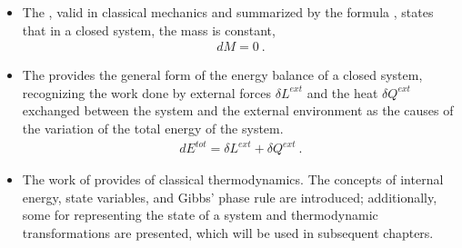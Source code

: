 \documentclass[letterpaper,10pt,english]{jupyterBook}
\begin{document}
\begin{itemize}
\item {} 
\sphinxAtStartPar
The {\hyperref[\detokenize{ch/principles-lavoisier:physics-hs-thermodynamics-foundation-principles-lavoisier}]{}}, valid in classical mechanics and summarized by the formula , states that in a closed system, the mass is constant,
\begin{equation*}
\begin{split}d M = 0 \ .\end{split}
\end{equation*}
\item {} 
\sphinxAtStartPar
The {\hyperref[\detokenize{ch/principles-first:physics-hs-thermodynamics-foundation-principles-first}]{}} provides the general form of the  energy balance of a closed system, recognizing the work done by external forces \(\delta L^{ext}\) and the heat \(\delta Q^{ext}\) exchanged between the system and the external environment as the causes of the variation of the total energy of the system.
\begin{equation*}
\begin{split}d E^{tot} = \delta L^{ext} + \delta Q^{ext} \ .\end{split}
\end{equation*}
\item {} 
\sphinxAtStartPar
The work of  provides {\hyperref[\detokenize{ch/principles-gibbs-phase-rule:physics-hs-thermodynamics-foundation-principles-gibbs-phase-rule}]{}} of classical thermodynamics. The concepts of internal energy, state variables, and Gibbs’ phase rule are introduced; additionally, some  for representing the state of a system and thermodynamic transformations are presented, which will be used in subsequent chapters.


\end{itemize}
\end{document}
